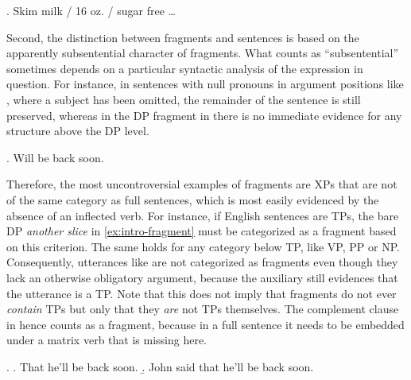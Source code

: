 \ex. Skim milk / 16 oz. / sugar free \dots

Second, the distinction between fragments and sentences is based on the apparently subsentential character of fragments. What counts as ``subsentential'' sometimes depends on a particular syntactic analysis of the expression in question. For instance, in sentences with null pronouns in argument positions like \Next, where a subject has been omitted, the remainder of the sentence is still preserved, whereas in the DP fragment in \LLast[a] there is no immediate evidence for any structure above the DP level.

\ex. Will be back soon.

Therefore, the most uncontroversial examples of fragments are XPs that are not of the same category as full sentences, which is most easily evidenced by the absence of an inflected verb. For instance, if English sentences are TPs, the bare DP \textit{another slice} in \ref{ex:intro-fragment} must be categorized as a fragment based on this criterion. The same holds for any category below TP, like VP, PP or NP. Consequently, utterances like \Last are not categorized as fragments even though they lack an otherwise obligatory argument, because the auxiliary still evidences that the utterance is a TP. Note that this does not imply that fragments do not ever \textit{contain} TPs but only that they \textit{are} not TPs themselves. The complement clause in \Next[a] hence counts as a fragment, because in a full sentence it needs to be embedded under a matrix verb \Next[b] that is missing here. 

\ex. \a. That he'll be back soon.
     \b. John said that he'll be back soon.

